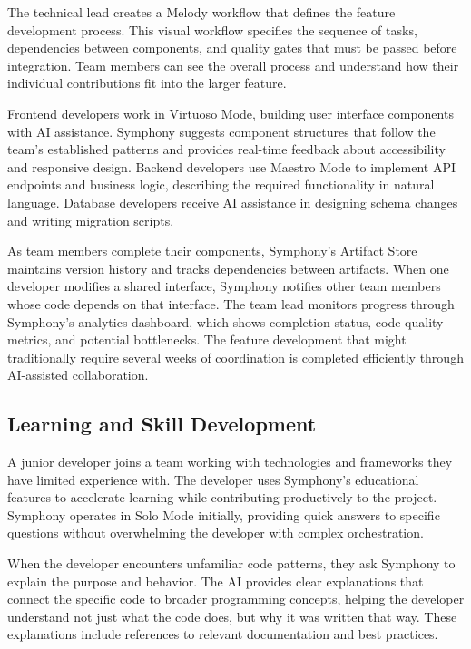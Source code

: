 The technical lead creates a Melody workflow that defines the feature development process. This visual workflow specifies the sequence of tasks, dependencies between components, and quality gates that must be passed before integration. Team members can see the overall process and understand how their individual contributions fit into the larger feature.

Frontend developers work in Virtuoso Mode, building user interface components with AI assistance. Symphony suggests component structures that follow the team's established patterns and provides real-time feedback about accessibility and responsive design. Backend developers use Maestro Mode to implement API endpoints and business logic, describing the required functionality in natural language. Database developers receive AI assistance in designing schema changes and writing migration scripts.

As team members complete their components, Symphony's Artifact Store maintains version history and tracks dependencies between artifacts. When one developer modifies a shared interface, Symphony notifies other team members whose code depends on that interface. The team lead monitors progress through Symphony's analytics dashboard, which shows completion status, code quality metrics, and potential bottlenecks. The feature development that might traditionally require several weeks of coordination is completed efficiently through AI-assisted collaboration.

\subsection{Learning and Skill Development}
\label{subsec:learning-development}

A junior developer joins a team working with technologies and frameworks they have limited experience with. The developer uses Symphony's educational features to accelerate learning while contributing productively to the project. Symphony operates in Solo Mode initially, providing quick answers to specific questions without overwhelming the developer with complex orchestration.

When the developer encounters unfamiliar code patterns, they ask Symphony to explain the purpose and behavior. The AI provides clear explanations that connect the specific code to broader programming concepts, helping the developer understand not just what the code does, but why it was written that way. These explanations include references to relevant documentation and best practices.

